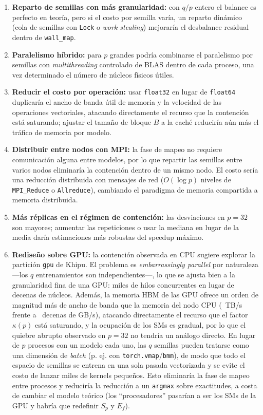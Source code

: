 \documentclass[11pt, a4paper]{article}
\begin{document}
\begin{enumerate}
    \item \textbf{Reparto de semillas con más granularidad:} con $q/p$ entero el balance es perfecto en teoría, pero si el costo por semilla varía, un reparto dinámico (cola de semillas con \texttt{Lock} o \textit{work stealing}) mejoraría el desbalance residual dentro de \texttt{wall\_map}.
    \item \textbf{Paralelismo híbrido:} para $p$ grandes podría combinarse el paralelismo por semillas con \textit{multithreading} controlado de BLAS dentro de cada proceso, una vez determinado el número de núcleos físicos útiles.
    \item \textbf{Reducir el costo por operación:} usar \texttt{float32} en lugar de \texttt{float64} duplicaría el ancho de banda útil de memoria y la velocidad de las operaciones vectoriales, atacando directamente el recurso que la contención está saturando; ajustar el tamaño de bloque $B$ a la caché reduciría aún más el tráfico de memoria por modelo.
    \item \textbf{Distribuir entre nodos con MPI:} la fase de mapeo no requiere comunicación alguna entre modelos, por lo que repartir las semillas entre varios nodos eliminaría la contención dentro de un mismo nodo. El costo sería una reducción distribuida con mensajes de red ($O(\log p)$ niveles de \texttt{MPI\_Reduce} o \texttt{Allreduce}), cambiando el paradigma de memoria compartida a memoria distribuida.
    \item \textbf{Más réplicas en el régimen de contención:} las desviaciones en $p = 32$ son mayores; aumentar las repeticiones o usar la mediana en lugar de la media daría estimaciones más robustas del speedup máximo.
    \item \textbf{Rediseño sobre GPU:} la contención observada en CPU sugiere explorar la partición \texttt{gpu} de Khipu. El problema es \textit{embarrassingly parallel} por naturaleza ---los $q$ entrenamientos son independientes---, lo que se ajusta bien a la granularidad fina de una GPU: miles de hilos concurrentes en lugar de decenas de núcleos. Además, la memoria HBM de las GPU ofrece un orden de magnitud más de ancho de banda que la memoria del nodo CPU (~TB/s frente a ~decenas de GB/s), atacando directamente el recurso que el factor $\kappa(p)$ está saturando, y la ocupación de los SMs es gradual, por lo que el quiebre abrupto observado en $p = 32$ no tendría un análogo directo. En lugar de $p$ procesos con un modelo cada uno, las $q$ semillas pueden tratarse como una dimensión de \textit{batch} (p. ej. con \texttt{torch.vmap}/\texttt{bmm}), de modo que todo el espacio de semillas se entrena en una sola pasada vectorizada y se evite el costo de lanzar miles de kernels pequeños. Esto eliminaría la fase de mapeo entre procesos y reduciría la reducción a un \texttt{argmax} sobre exactitudes, a costa de cambiar el modelo teórico (los ``procesadores'' pasarían a ser los SMs de la GPU y habría que redefinir $S_p$ y $E_f$).
\end{enumerate}
\end{document}
